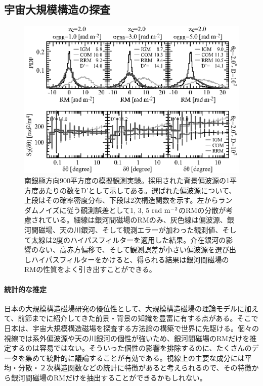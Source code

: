 \subsection{宇宙大規模構造の探査}
\label{c06.s3.ss9}

\begin{figure}[tbp]
\begin{center}
\includegraphics[width=0.7\linewidth]{magnetism/c06.s3.ss9.f1.eps}
\end{center}
\caption{南銀極方向900平方度の模擬観測実験\citep{2014ApJ...790..123A}。採用された背景偏波源の1平方度あたりの数をD'として示してある。選ばれた偏波源について、上段はその確率密度分布、下段は2次構造関数を示す。左からランダムノイズに従う観測誤差として1, 3, 5 ${\rm rad~m^{-2}}$のRMの分散が考慮されている。細線は銀河間磁場のRMのみ、灰色線は偏波源、銀河間磁場、天の川銀河、そして観測エラーが加わった観測値、そして太線は2度のハイパスフィルターを適用した結果。介在銀河の影響のない、高赤方偏移で、そして観測誤差が小さい偏波源を選び出しハイパスフィルターをかけると、得られる結果は銀河間磁場のRMの性質をよく引き出すことができる。
}\label{c06.s3.ss9.f1}
\end{figure}

\paragraph{統計的な推定}

日本の大規模構造磁場研究の優位性として、大規模構造磁場の理論モデルに加えて、前節までに紹介してきた前景・背景の知識を豊富に有する点がある。そこで日本は、宇宙大規模構造磁場を探査する方法論の構築で世界に先駆ける。個々の視線では系外偏波源や天の川銀河の個性が強いため、銀河間磁場のRMだけを推定するのは容易ではない。そういった個性の影響を排除するのに、たくさんのデータを集めて統計的に議論することが有効である。視線上の主要な成分には平均・分散・２次構造関数などの統計に特徴があると考えられるので、その特徴から銀河間磁場のRMだけを抽出することができるかもしれない。

